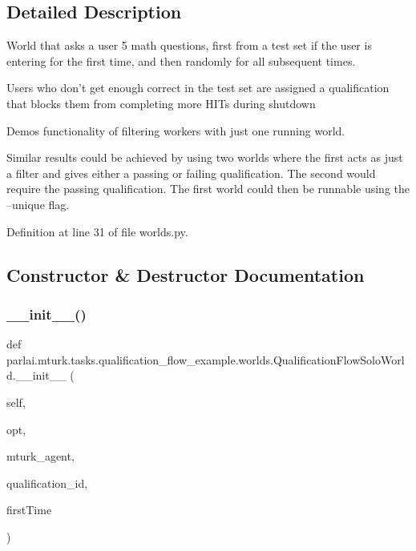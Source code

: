 \subsection{Detailed Description}
\begin{DoxyVerb}World that asks a user 5 math questions, first from a test set if the user is
entering for the first time, and then randomly for all subsequent times.

Users who don't get enough correct in the test set are assigned a
qualification that blocks them from completing more HITs during shutdown

Demos functionality of filtering workers with just one running world.

Similar results could be achieved by using two worlds where the first acts
as just a filter and gives either a passing or failing qualification. The
second would require the passing qualification. The first world could then
be runnable using the --unique flag.
\end{DoxyVerb}
 

Definition at line 31 of file worlds.\+py.



\subsection{Constructor \& Destructor Documentation}
\mbox{\label{classparlai_1_1mturk_1_1tasks_1_1qualification__flow__example_1_1worlds_1_1QualificationFlowSoloWorld_a3d703ff5db42f79baaec3cd6e601edaf}} 
\subsubsection{\texorpdfstring{\+\_\+\+\_\+init\+\_\+\+\_\+()}{\_\_init\_\_()}}
{\footnotesize\ttfamily def parlai.\+mturk.\+tasks.\+qualification\+\_\+flow\+\_\+example.\+worlds.\+Qualification\+Flow\+Solo\+World.\+\_\+\+\_\+init\+\_\+\+\_\+ (\begin{DoxyParamCaption}\item[{}]{self,  }\item[{}]{opt,  }\item[{}]{mturk\+\_\+agent,  }\item[{}]{qualification\+\_\+id,  }\item[{}]{first\+Time }\end{DoxyParamCaption})}



